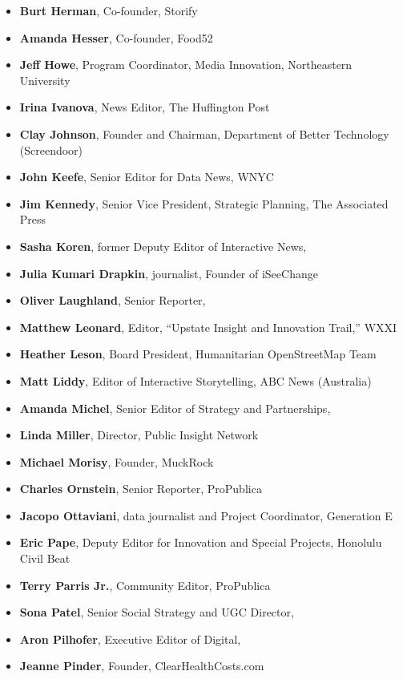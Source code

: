\begin{itemize}
\begin{itemize}
\begin{itemize}
\item \textbf{Burt Herman}, Co-founder, Storify
\item \textbf{Amanda Hesser}, Co-founder, Food52
\item \textbf{Jeff Howe}, Program Coordinator, Media Innovation, Northeastern University
\item \textbf{Irina Ivanova}, News Editor, The Huffington Post
\item \textbf{Clay Johnson}, Founder and Chairman, Department of Better Technology (Screendoor)
\item \textbf{John Keefe}, Senior Editor for Data News, WNYC
\item \textbf{Jim Kennedy}, Senior Vice President, Strategic Planning, The Associated Press
\item \textbf{Sasha Koren}, former Deputy Editor of Interactive News, 
\item \textbf{Julia Kumari Drapkin}, journalist, Founder of iSeeChange
\item \textbf{Oliver Laughland}, Senior Reporter, 
\item \textbf{Matthew Leonard}, Editor, ``Upstate Insight and Innovation Trail,'' WXXI
\item \textbf{Heather Leson}, Board President, Humanitarian OpenStreetMap Team
\item \textbf{Matt Liddy}, Editor of Interactive Storytelling, ABC News (Australia)
\item \textbf{Amanda Michel}, Senior Editor of Strategy and Partnerships, 
\item \textbf{Linda Miller}, Director, Public Insight Network
\item \textbf{Michael Morisy}, Founder, MuckRock
\item \textbf{Charles Ornstein}, Senior Reporter, ProPublica
\item \textbf{Jacopo Ottaviani}, data journalist and Project Coordinator, Generation E
\item \textbf{Eric Pape}, Deputy Editor for Innovation and Special Projects, Honolulu Civil Beat
\item \textbf{Terry Parris Jr.}, Community Editor, ProPublica
\item \textbf{Sona Patel}, Senior Social Strategy and UGC Director, 
\item \textbf{Aron Pilhofer}, Executive Editor of Digital, 
\item \textbf{Jeanne Pinder}, Founder, ClearHealthCosts.com

\end{itemize}
\end{itemize}
\end{itemize}
